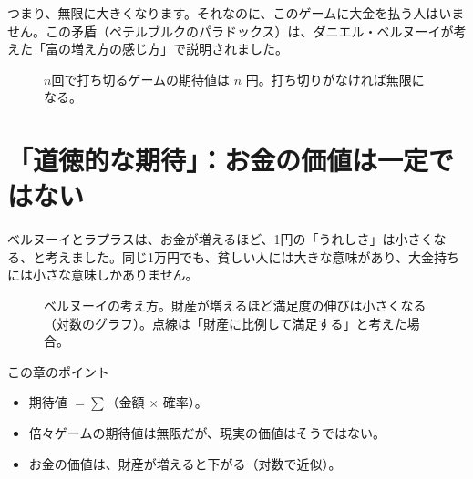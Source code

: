 \documentclass[a4paper,11pt,openany]{ltjsbook}
\begin{document}
つまり、無限に大きくなります。それなのに、このゲームに大金を払う人はいません。この矛盾（ペテルブルクのパラドックス）は、ダニエル・ベルヌーイが考えた「富の増え方の感じ方」で説明されました。

\begin{figure}[htbp]
\centering
{}
\caption{$n$回で打ち切るゲームの期待値は $n$ 円。打ち切りがなければ無限になる。}
\end{figure}

\section{「道徳的な期待」：お金の価値は一定ではない}

ベルヌーイとラプラスは、お金が増えるほど、1円の「うれしさ」は小さくなる、と考えました。同じ1万円でも、貧しい人には大きな意味があり、大金持ちには小さな意味しかありません。

\begin{figure}[htbp]
\centering
{}
\caption{ベルヌーイの考え方。財産が増えるほど満足度の伸びは小さくなる（対数のグラフ）。点線は「財産に比例して満足する」と考えた場合。}
\end{figure}

\begin{pointbox}{この章のポイント}
\begin{itemize}[leftmargin=1.5em]
\item 期待値 $=\sum$（金額 $\times$ 確率）。
\item 倍々ゲームの期待値は無限だが、現実の価値はそうではない。
\item お金の価値は、財産が増えると下がる（対数で近似）。
\end{itemize}
\end{pointbox}
\end{document}
